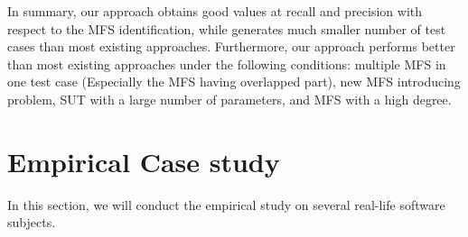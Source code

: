 \documentclass{sig-alternate-05-2015}
\begin{document}
{{In summary, our approach obtains good values at recall and precision with respect to the MFS identification, while generates much smaller number of test cases than most existing approaches. Furthermore, our approach performs better than most existing approaches under the following conditions: multiple MFS in one test case (Especially the MFS having overlapped part), new  MFS introducing problem, SUT with a large number of parameters, and MFS with a high degree.


\section{Empirical Case study}\label{sec:realEx}
In this section, we will conduct the empirical study on several real-life software subjects.



%
%





}}
\end{document}
